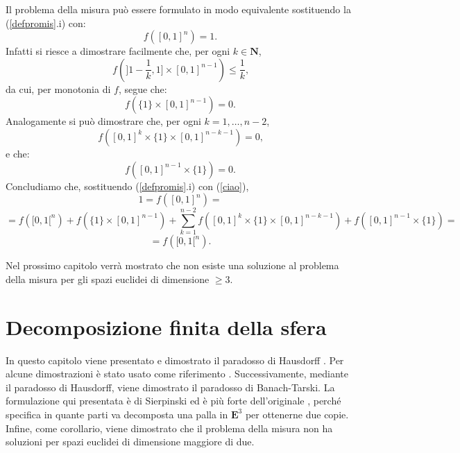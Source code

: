 \documentclass[a4paper,oneside,11pt]{book}
\theoremstyle{definition} \newtheorem{Def}{Definizione}
\theoremstyle{plain} \newtheorem{teo}{Teorema}
\theoremstyle{plain} \newtheorem{cor}[teo]{Corollario}
\theoremstyle{definition} \newtheorem{lem}[teo]{Lemma}
\theoremstyle{plain} \newtheorem{pro}[teo]{Proposizione}
\newcommand{\ug}[1]{(\ref{#1})} %
\begin{document}
	Il problema della misura può essere formulato in modo equivalente sostituendo la (\ref{defpromis}.i) con:
	\begin{equation}\label{ciao}
		f([0,1]^n) = 1 \text{.}
	\end{equation}
	Infatti si riesce a dimostrare facilmente che, per ogni $k \in \mathbf{N}$,
	\begin{equation*}
		f(]1-\frac{1}{k},1] \times [0,1]^{n-1}) \leq \frac{1}{k} \text{,}
	\end{equation*}
	da cui, per monotonia di $f$, segue che:
	\begin{equation*}
		f(\{1\} \times [0,1]^{n-1}) = 0 \text{.}
	\end{equation*}
	Analogamente si può dimostrare che, per ogni $k = 1, \dots, n-2$,
	\begin{equation*}
		f([0,1]^k \times \{1\} \times [0,1]^{n-k-1}) = 0 \text{,}
	\end{equation*}
	e che:
	\begin{equation*}
		f([0,1]^{n-1} \times \{1\}) = 0 \text{.}
	\end{equation*}
	Concludiamo che, sostituendo (\ref{defpromis}.i) con \ug{ciao},
	\begin{equation*}
		1 = f([0,1]^n) =
	\end{equation*}
	\begin{equation*}
		= f([0,1[^n) + f(\{1\} \times [0,1]^{n-1}) + \sum_{k=1}^{n-2} f([0,1]^k \times \{1\} \times [0,1]^{n-k-1}) + f([0,1]^{n-1} \times \{1\}) =
	\end{equation*}
	\begin{equation*}
		= f([0,1[^n) \text{.}
	\end{equation*}
	
	\bigskip
	
	Nel prossimo capitolo verrà mostrato che non esiste una soluzione al problema della misura per gli spazi euclidei di dimensione $\geq 3$. 
	
		 
\chapter{Decomposizione finita della sfera}
	
	In questo capitolo viene presentato e dimostrato il paradosso di Hausdorff \cite{felix}. Per alcune dimostrazioni è stato usato come riferimento \cite{strom}. Successivamente, mediante il paradosso di Hausdorff, viene dimostrato il paradosso di Banach-Tarski. La formulazione qui presentata è di Sierpinski \cite{sierp} ed è più forte dell'originale \cite{bantar}, perché specifica in quante parti va decomposta una palla in $\mathbf{E}^3$ per ottenerne due copie. Infine, come corollario, viene dimostrato che il problema della misura non ha soluzioni per spazi euclidei di dimensione maggiore di due.
	
\end{document}

